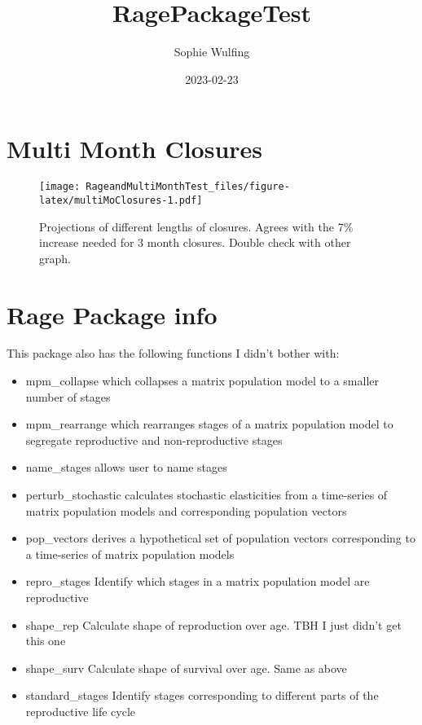 \documentclass[
]{article}
\title{RagePackageTest}
\author{Sophie Wulfing}
\date{2023-02-23}
\begin{document}
\maketitle

\hypertarget{multi-month-closures}{%
\section{Multi Month Closures}\label{multi-month-closures}}

\begin{figure}
\centering
\texttt{[image: RageandMultiMonthTest\_files/figure-latex/multiMoClosures-1.pdf]}
\caption{Projections of different lengths of closures. Agrees with the
7\% increase needed for 3 month closures. Double check with other
graph.}
\end{figure}

\newpage

\hypertarget{rage-package-info}{%
\section{Rage Package info}\label{rage-package-info}}

This package also has the following functions I didn't bother with:

\begin{itemize}
\item
  mpm\_collapse which collapses a matrix population model to a smaller
  number of stages
\item
  mpm\_rearrange which rearranges stages of a matrix population model to
  segregate reproductive and non-reproductive stages
\item
  name\_stages allows user to name stages
\item
  perturb\_stochastic calculates stochastic elasticities from a
  time-series of matrix population models and corresponding population
  vectors
\item
  pop\_vectors derives a hypothetical set of population vectors
  corresponding to a time-series of matrix population models
\item
  repro\_stages Identify which stages in a matrix population model are
  reproductive
\item
  shape\_rep Calculate shape of reproduction over age. TBH I just didn't
  get this one
\item
  shape\_surv Calculate shape of survival over age. Same as above
\item
  standard\_stages Identify stages corresponding to different parts of
  the reproductive life cycle
\end{itemize}
\end{document}
